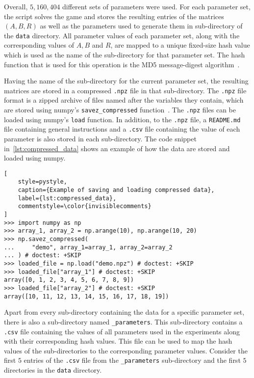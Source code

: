Overall, \(5,\!160,\!404\) different sets of parameters were used.
For each parameter set, the script solves the game and stores the resulting
entries of the matrices \((A, B, R)\) as well as the parameters used to generate
them in sub-directory of the \texttt{data} directory.
All parameter values of each parameter set, along with the corresponding values
of \(A, B\) and \(R\), are mapped to a unique fixed-size hash value which is
used as the name of the sub-directory for that parameter set.
The hash function that is used for this operation is the MD5 message-digest
algorithm~\cite{rivest1992md5}.

Having the name of the sub-directory for the current parameter set, the
resulting matrices are stored in a compressed \texttt{.npz} file in that
sub-directory.
The \texttt{.npz} file format is a zipped archive of files
named after the variables they contain, which are stored using numpy's
\texttt{savez\_compressed} function~\cite{2020NumPy-Array}.
The \texttt{.npz} files can be loaded using numpy's
\texttt{load} function.
In addition, to the \texttt{.npz} file, a
\texttt{README.md} file containing general instructions and a
\texttt{.csv} file containing the value of each parameter is
also stored in each sub-directory.
The code snippet in~\ref{lst:compressed_data} shows an example of how the data
are stored and loaded using numpy.

\newpage

\begin{lstlisting}[
    style=pystyle,
    caption={Example of saving and loading compressed data},
    label={lst:compressed_data},
    commentstyle=\color{invisiblecomments}
]
>>> import numpy as np
>>> array_1, array_2 = np.arange(10), np.arange(10, 20)
>>> np.savez_compressed(
...     "demo", array_1=array_1, array_2=array_2
... ) # doctest: +SKIP
>>> loaded_file = np.load("demo.npz") # doctest: +SKIP
>>> loaded_file["array_1"] # doctest: +SKIP
array([0, 1, 2, 3, 4, 5, 6, 7, 8, 9])
>>> loaded_file["array_2"] # doctest: +SKIP
array([10, 11, 12, 13, 14, 15, 16, 17, 18, 19])

\end{lstlisting}

Apart from every sub-directory containing the data for a specific parameter set,
there is also a sub-directory named \texttt{\_parameters}.
This sub-directory contains a \texttt{.csv} file containing the
values of all parameters used in the experiments along with their corresponding
hash values.
This file can be used to map the hash values of the sub-directories to the
corresponding parameter values.
Consider the first \(5\) entries of the \texttt{.csv} file
from the \texttt{\_parameters} sub-directory and the first
\(5\) directories in the \texttt{data} directory.

